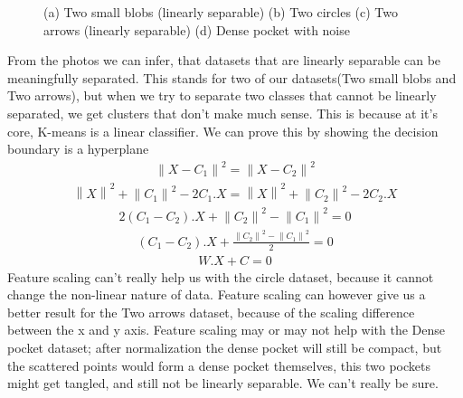 \documentclass[12pt,onecolumn,a4paper]{article}
\newcommand{\norm}[1]{\left\lVert#1\right\rVert}
\begin{document}
\begin{figure}[H]
	\centering
	\caption{(a) Two small blobs (linearly separable) (b) Two circles (c) Two arrows (linearly separable) (d) Dense pocket with noise}
	\label{fig:foobar}
\end{figure}
From the photos we can infer, that datasets that are linearly separable can be meaningfully separated. This stands for two of our datasets(Two small blobs and Two arrows), but when we try to separate two classes that cannot be linearly separated, we get clusters that don't make much sense. This is because at it's core, K-means is a linear classifier. We can prove this by showing the decision boundary is a hyperplane
\begin{align*}
	\norm{X - C_1}^2 = \norm{X - C_2}^2
\end{align*} 
\begin{align*}
	\norm{X}^2 + \norm{C_1}^2 - 2C_1.X = \norm{X}^2 + \norm{C_2}^2 - 2C_2.X
\end{align*}
\begin{align*}
	2(C_1 - C_2).X + \norm{C_2}^2 - \norm{C_1}^2 = 0
\end{align*}
\begin{align*}
	(C_1 - C_2).X + \frac{\norm{C_2}^2 - \norm{C_1}^2}{2} = 0
\end{align*}
\begin{align*}
	W.X + C = 0
\end{align*}
Feature scaling can't really help us with the circle dataset, because it cannot change the non-linear nature of data. Feature scaling can however give us a better result for the Two arrows dataset, because of the scaling difference between the x and y axis. Feature scaling may or may not help with the Dense pocket dataset; after normalization the dense pocket will still be compact, but the scattered points would form a dense pocket themselves, this two pockets might get tangled, and still not be linearly separable. We can't really be sure.
\end{document}
